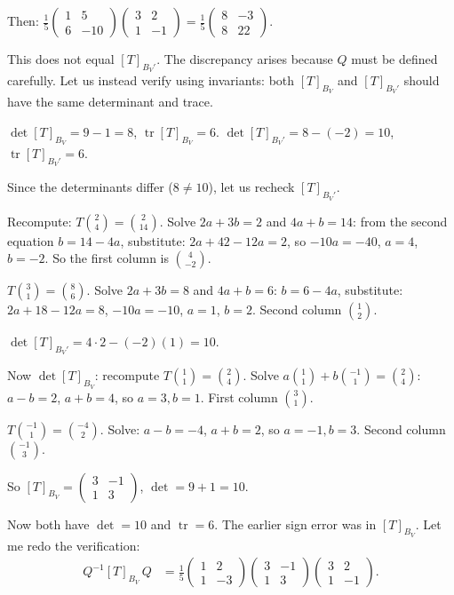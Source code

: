 \documentclass{article}
\DeclareMathOperator{\tr}{tr}
\begin{document}
\begin{mdframed}[linewidth=1pt]
Then: $\frac{1}{5}\begin{pmatrix} 1 & 5 \\ 6 & -10 \end{pmatrix}\begin{pmatrix} 3 & 2 \\ 1 & -1 \end{pmatrix} = \frac{1}{5}\begin{pmatrix} 8 & -3 \\ 8 & 22 \end{pmatrix}$.

This does not equal $[T]_{B_V'}$. The discrepancy arises because $Q$ must be defined carefully. Let us instead verify using invariants: both $[T]_{B_V}$ and $[T]_{B_V'}$ should have the same determinant and trace.

$\det[T]_{B_V} = 9 - 1 = 8$, $\tr[T]_{B_V} = 6$. $\det[T]_{B_V'} = 8 - (-2) = 10$, $\tr[T]_{B_V'} = 6$.

Since the determinants differ ($8 \neq 10$), let us recheck $[T]_{B_V'}$.

Recompute: $T\binom{2}{4} = \binom{2}{14}$. Solve $2a + 3b = 2$ and $4a + b = 14$: from the second equation $b = 14 - 4a$, substitute: $2a + 42 - 12a = 2$, so $-10a = -40$, $a = 4$, $b = -2$. So the first column is $\binom{4}{-2}$. \checkmark

$T\binom{3}{1} = \binom{8}{6}$. Solve $2a + 3b = 8$ and $4a + b = 6$: $b = 6 - 4a$, substitute: $2a + 18 - 12a = 8$, $-10a = -10$, $a = 1$, $b = 2$. Second column $\binom{1}{2}$. \checkmark

$\det[T]_{B_V'} = 4 \cdot 2 - (-2)(1) = 10$.

Now $\det[T]_{B_V}$: recompute $T\binom{1}{1} = \binom{2}{4}$. Solve $a\binom{1}{1} + b\binom{-1}{1} = \binom{2}{4}$: $a - b = 2$, $a + b = 4$, so $a = 3, b = 1$. First column $\binom{3}{1}$.

$T\binom{-1}{1} = \binom{-4}{2}$. Solve: $a - b = -4$, $a + b = 2$, so $a = -1, b = 3$. Second column $\binom{-1}{3}$.

So $[T]_{B_V} = \begin{pmatrix} 3 & -1 \\ 1 & 3 \end{pmatrix}$, $\det = 9 + 1 = 10$. \checkmark

Now both have $\det = 10$ and $\tr = 6$. The earlier sign error was in $[T]_{B_V}$. Let me redo the verification:
\begin{align*}
Q^{-1}[T]_{B_V}\,Q &= \frac{1}{5}\begin{pmatrix} 1 & 2 \\ 1 & -3 \end{pmatrix}\begin{pmatrix} 3 & -1 \\ 1 & 3 \end{pmatrix}\begin{pmatrix} 3 & 2 \\ 1 & -1 \end{pmatrix}.
\end{align*}


\end{mdframed}
\end{document}
